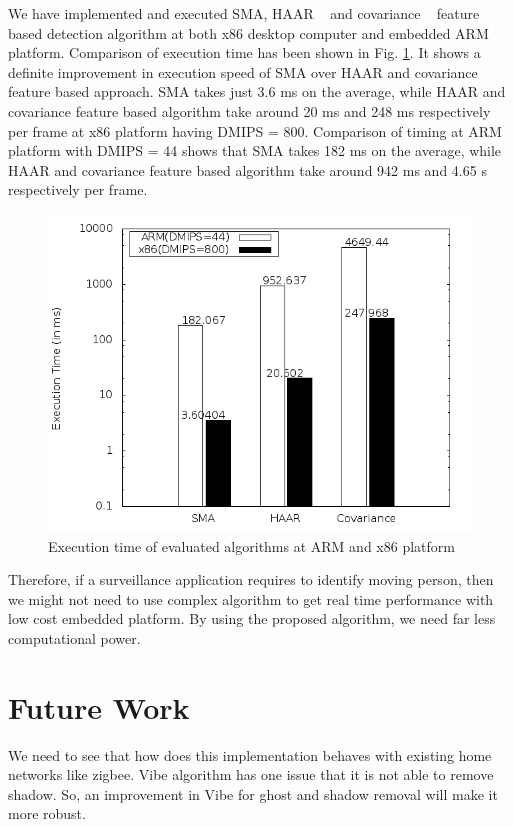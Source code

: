 \documentclass[conference]{IEEEtran}
\begin{document}
\indent We have implemented and executed SMA, HAAR ~\cite{2} and
covariance ~\cite{19} feature based detection algorithm at both x86
desktop computer and embedded ARM platform. Comparison of execution time
has been shown in Fig.  \ref{pipeline_execution_time}. It shows a
definite improvement in execution speed of SMA over HAAR and covariance
feature based approach.  SMA takes just 3.6 ms on the average, while
HAAR and covariance feature based algorithm take around 20 ms and 248 ms
respectively per frame at x86 platform having DMIPS = 800. Comparison of
timing at ARM platform with DMIPS = 44 shows that SMA takes 182 ms
on the average, while HAAR and covariance feature based algorithm take
around 942 ms and 4.65 s respectively per frame.  \\
\begin{figure}[!h]
\centering
\includegraphics[scale=0.30]{figures/pipeline_execution_time}
\caption{Execution time of evaluated algorithms at ARM and x86
platform}
\label{pipeline_execution_time}
\end{figure}

Therefore, if a surveillance application requires to identify moving person,
then we might not need to use complex algorithm to get real time
performance with low cost embedded platform. By using the proposed
algorithm, we need far less computational power.

\section{Future Work}

We need to see that how does this implementation behaves with existing home
networks like zigbee. Vibe algorithm has one issue that it is not able to
remove shadow. So, an improvement in Vibe for ghost and shadow removal
will make it more robust.
\end{document}
